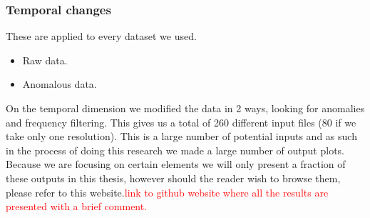 \subsubsection*{Temporal changes}
These are applied to every dataset we used.
\begin{itemize}
    \item Raw data.
    \item Anomalous data.
\end{itemize}

On the temporal dimension we modified the data in 2 ways, looking for anomalies and frequency filtering. This gives us a total of 260 different input files (80 if we take only one resolution). This is a large number of potential inputs and as such in the process of doing this research we made a large number of output plots. Because we are focusing on certain elements we will only present a fraction of these outputs in this thesis, however should the reader wish to browse them, please refer to this website.\textcolor{red}{link to github website where all the results are presented with a brief comment.}